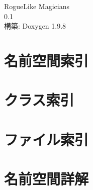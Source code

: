 \documentclass[twoside]{book}
\newcommand{\+}{\discretionary{\mbox{\scriptsize$\hookleftarrow$}}{}{}}
\newcommand{\clearemptydoublepage}{%
    \newpage{\pagestyle{empty}\cleardoublepage}%
  }
\begin{document}
  \raggedbottom
  \begin{CJK}{UTF8}{min}
    \hypersetup{pageanchor=false,
                bookmarksnumbered=true,
                pdfencoding=unicode
               }
  \begin{titlepage}
  \vspace*{7cm}
  \begin{center}%
  {\Large Rogue\+Like Magicians}\\
  [1ex]\large 0.\+1 \\
  \vspace*{1cm}
  {\large 構築\+: Doxygen 1.9.8}\\
  \end{center}
  \end{titlepage}
  \clearemptydoublepage
  \tableofcontents
  \clearemptydoublepage
  \hypersetup{pageanchor=true}
\chapter{名前空間索引}

\chapter{クラス索引}

\chapter{ファイル索引}

\chapter{名前空間詳解}



\end{CJK}
\end{document}
